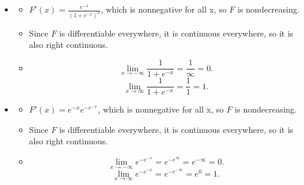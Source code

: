 \documentclass[12pt]{article}
\newenvironment{problem}[2][Problem]{\begin{trivlist}
\item[\hskip \labelsep {\bfseries #1}\hskip \labelsep {\bfseries #2.}]}
{\end{trivlist}}
\begin{document}
\begin{problem}{1}
\begin{itemize}
    \begin{itemize}
      \item [(b)]
      \begin{itemize}
        \item[i.] $F'(x) = \frac{e^{-x}}{(1+e^{-x})^2}$, which is nonnegative
        for all x, so $F$ is nondecreasing.
        \item[ii.] Since $F$ is differentiable everywhere, 
        it is continuous everywhere, so it is also right continuous.
        \item[iii.] 
        \[
          \lim_{x \to -\infty} \frac{1}{1+e^{-x}} = \frac{1}{\infty} = 0.
        \]
        \[
          \lim_{x \to \infty} \frac{1}{1+e^{-x}} = \frac{1}{1} = 1.
        \]
      \end{itemize}
      \item [(c)]
      \begin{itemize}
        \item[i.] $F'(x) = e^{-x}e^{-e^{-x}}$, which is nonnegative for all x,
        so $F$ is nondecreasing.
        \item[ii.] Since $F$ is differentiable everywhere, 
        it is continuous everywhere, so it is also right continuous.
        \item[iii.] 
        \[
          \lim_{x \to -\infty} e^{-e^{-x}} = e^{-e^{\infty}} = e^{-\infty} = 0.
        \]
        \[
          \lim_{x \to \infty} e^{-e^{-x}} = e^{-e^{-\infty}} = e^{0} = 1.
        \]
      \end{itemize}
    \end{itemize}
  \end{itemize}
\end{problem}
\end{document}
